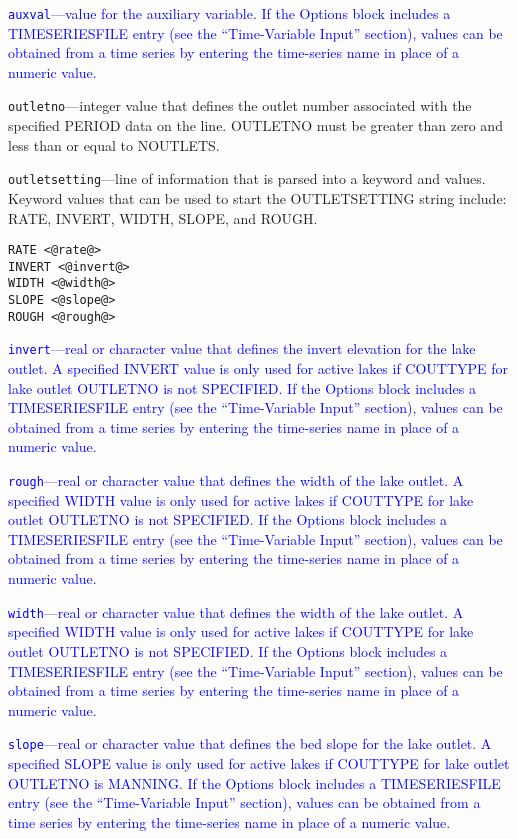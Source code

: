 \begin{description}
\item \textcolor{blue}{\texttt{auxval}---value for the auxiliary variable. If the Options block includes a TIMESERIESFILE entry (see the ``Time-Variable Input'' section), values can be obtained from a time series by entering the time-series name in place of a numeric value.}

\item \texttt{outletno}---integer value that defines the outlet number associated with the specified PERIOD data on the line. OUTLETNO must be greater than zero and less than or equal to NOUTLETS.

\item \texttt{outletsetting}---line of information that is parsed into a keyword and values.  Keyword values that can be used to start the OUTLETSETTING string include: RATE, INVERT, WIDTH, SLOPE, and ROUGH.

\begin{lstlisting}[style=blockdefinition]
RATE <@rate@>
INVERT <@invert@>
WIDTH <@width@>
SLOPE <@slope@>
ROUGH <@rough@>
\end{lstlisting}

\item \textcolor{blue}{\texttt{invert}---real or character value that defines the invert elevation for the lake outlet. A specified INVERT value is only used for active lakes if COUTTYPE for lake outlet OUTLETNO is not SPECIFIED. If the Options block includes a TIMESERIESFILE entry (see the ``Time-Variable Input'' section), values can be obtained from a time series by entering the time-series name in place of a numeric value.}

\item \textcolor{blue}{\texttt{rough}---real or character value that defines the width of the lake outlet. A specified WIDTH value is only used for active lakes if COUTTYPE for lake outlet OUTLETNO is not SPECIFIED. If the Options block includes a TIMESERIESFILE entry (see the ``Time-Variable Input'' section), values can be obtained from a time series by entering the time-series name in place of a numeric value.}

\item \textcolor{blue}{\texttt{width}---real or character value that defines the width of the lake outlet. A specified WIDTH value is only used for active lakes if COUTTYPE for lake outlet OUTLETNO is not SPECIFIED. If the Options block includes a TIMESERIESFILE entry (see the ``Time-Variable Input'' section), values can be obtained from a time series by entering the time-series name in place of a numeric value.}

\item \textcolor{blue}{\texttt{slope}---real or character value that defines the bed slope for the lake outlet. A specified SLOPE value is only used for active lakes if COUTTYPE for lake outlet OUTLETNO is MANNING. If the Options block includes a TIMESERIESFILE entry (see the ``Time-Variable Input'' section), values can be obtained from a time series by entering the time-series name in place of a numeric value.}

\end{description}

